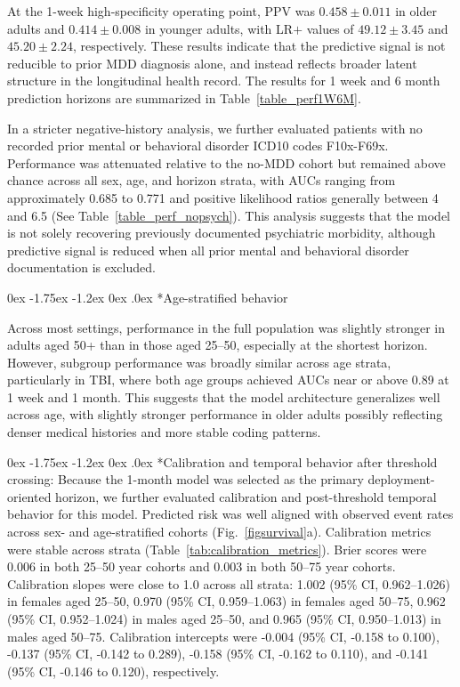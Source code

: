 \documentclass[onecolumn, compsoc,11pt]{IEEEtran}
\makeatletter
\renewcommand\subsection{\@startsection {subsection}{2}{\z@}
  {0ex \@plus -1.75ex \@minus -1.2ex}
  {0ex \@plus.0ex}
  {\fontsize{11}{11}\selectfont\bfseries\sffamily}}
\makeatother
\begin{document}
At the 1-week high-specificity operating point, PPV was $0.458 \pm 0.011$ in older adults and $0.414 \pm 0.008$ in younger adults, with LR$+$ values of $49.12 \pm 3.45$ and $45.20 \pm 2.24$, respectively. These results indicate that the predictive signal is not reducible to prior MDD diagnosis alone, and instead reflects broader latent structure in the longitudinal health record.
The results for 1 week and 6 month prediction horizons are summarized in Table~\ref{table_perf1W6M}.


In a stricter negative-history analysis, we further evaluated patients with no recorded prior mental or behavioral disorder ICD10 codes F10x-F69x. Performance was attenuated relative to the no-MDD cohort but remained above chance across all sex, age, and horizon strata, with AUCs ranging from approximately 0.685 to 0.771 and positive likelihood ratios generally between 4 and 6.5 (See Table~\ref{table_perf_nopsych}). This analysis suggests that the model is not solely recovering previously documented psychiatric morbidity, although predictive signal is reduced when all prior mental and behavioral disorder documentation is excluded.

\subsection*{Age-stratified behavior}

Across most settings, performance in the full population was slightly stronger in adults aged 50+ than in those aged 25--50, especially at the shortest horizon. However, subgroup performance was broadly similar across age strata, particularly in TBI, where both age groups achieved AUCs near or above 0.89 at 1 week and 1 month. This suggests that the model architecture generalizes well across age, with slightly stronger performance in older adults possibly reflecting denser medical histories and more stable coding patterns.

\subsection*{Calibration and temporal behavior after threshold crossing:}
Because the 1-month model was selected as the primary deployment-oriented horizon, we further evaluated calibration and post-threshold temporal behavior for this model. Predicted risk was well aligned with observed event rates across sex- and age-stratified cohorts (Fig.~\ref{figsurvival}a). Calibration metrics were stable across strata (Table~\ref{tab:calibration_metrics}). Brier scores were 0.006 in both 25--50 year cohorts and 0.003 in both 50--75 year cohorts. Calibration slopes were close to 1.0 across all strata: 1.002 (95\% CI, 0.962--1.026) in females aged 25--50, 0.970 (95\% CI, 0.959--1.063) in females aged 50--75, 0.962 (95\% CI, 0.952--1.024) in males aged 25--50, and 0.965 (95\% CI, 0.950--1.013) in males aged 50--75. Calibration intercepts were -0.004 (95\% CI, -0.158 to 0.100), -0.137 (95\% CI, -0.142 to 0.289), -0.158 (95\% CI, -0.162 to 0.110), and -0.141 (95\% CI, -0.146 to 0.120), respectively.
\end{document}

